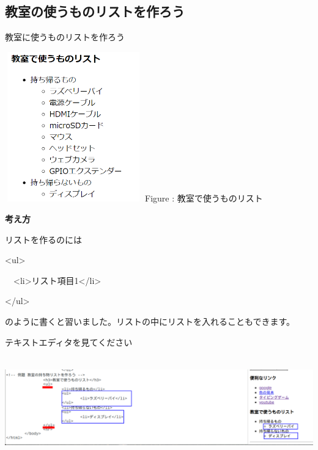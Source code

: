 \documentclass[a4paper,12pt]{jarticle}
\begin{document}
\clearpage
{}
\subsection{\theExercise 教室の使うものリストを作ろう}
教室に使うものリストを作ろう

\bigskip
\centering
\begin{minipage}{5.937cm}
  {\upshape
    \includegraphics[width=5.937cm,height=6.498cm]{textbook-img203.png}
    \newline
    Figure : 教室で使うものリスト}
\end{minipage}

\bigskip
\flushleft

\textbf{考え方}



リストを作るのには

{\textless}ul{\textgreater}

\ \ {\textless}li{\textgreater}リスト項目1{\textless}/li{\textgreater}

{\textless}/ul{\textgreater}

のように書くと習いました。リストの中にリストを入れることもできます。

テキストエディタを見てください

\bigskip

\centering
\includegraphics[width=15.519cm,height=4.383cm]{textbook-img204.png}
\end{document}
